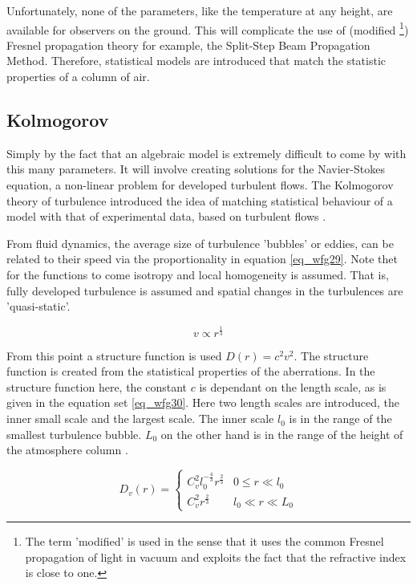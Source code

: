\documentclass{article}
\begin{document}
Unfortunately, none of the parameters, like the temperature at any height, are available for observers on the ground. This will complicate the use of (modified \footnote{The term 'modified' is used in the sense that it uses the common Fresnel propagation of light in vacuum and exploits the fact that the refractive index is close to one.}) Fresnel propagation theory for example, the Split-Step Beam Propagation Method. Therefore, statistical models are introduced that match the statistic properties of a column of air.

\subsection{Kolmogorov}
Simply by the fact that an algebraic model is extremely difficult to come by with this many parameters. It will involve creating solutions for the Navier-Stokes equation, a non-linear problem for developed turbulent flows.
The Kolmogorov theory of turbulence introduced the idea of matching statistical behaviour of a model with that of experimental data, based on turbulent flows \cite{kolmogorov1941local}. 

From fluid dynamics, the average size of turbulence 'bubbles' or eddies, can be related to their speed via the proportionality in equation \ref{eq_wfg29}. Note thet for the functions to come isotropy and local homogeneity  is assumed. That is, fully developed turbulence is assumed and spatial changes in the turbulences are 'quasi-static'.

\begin{equation}
v \propto r^{\frac{1}{3}}
\label{eq_wfg29}
\end{equation}

\newpage
From this point a structure function is used $D(r) = c^2 v^2$. The structure function is created from the statistical properties of the aberrations.  In the structure function here, the constant $c$ is dependant on the length scale, as is given in the equation set \ref{eq_wfg30}. Here two length scales are introduced, the inner small scale and the largest scale. The inner scale $l_0$ is in the range of the smallest turbulence bubble. $L_0$ on the other hand is in the range of the height of the atmosphere column \cite{zernikeMatlab}.

\begin{equation}
D_v(r) = 
\begin{cases}
C_v^2 l_0^{-\frac{4}{3}} r^{\frac{2}{3}} & 0 \leq r \ll l_0\\
C_v^2 r^{\frac{2}{3}} & l_0 \ll r \ll L_0 
\end{cases}
\label{eq_wfg30}
\end{equation}
\end{document}
